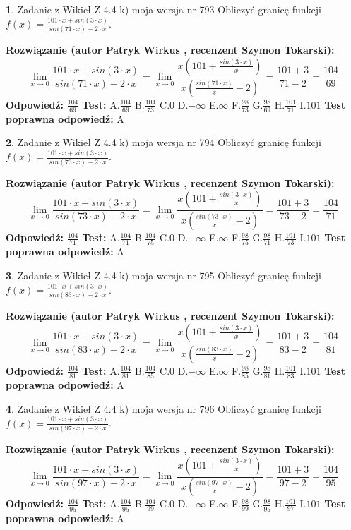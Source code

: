 \documentclass[12pt, a4paper]{article}
\theoremstyle{definition} %
\newtheorem{zad}{}
\newcommand{\zadStart}[1]{\begin{zad}#1\newline}
\newcommand{\zadStop}{\end{zad}}
\newcommand{\rozwStart}[2]{\noindent \textbf{Rozwiązanie (autor #1 , recenzent #2): }\newline}
\newcommand{\rozwStop}{\newline}
\newcommand{\odpStart}{\noindent \textbf{Odpowiedź:}\newline}
\newcommand{\odpStop}{\newline}
\newcommand{\testStart}{\noindent \textbf{Test:}\newline}
\newcommand{\testStop}{\newline}
\newcommand{\kluczStart}{\noindent \textbf{Test poprawna odpowiedź:}\newline}
\newcommand{\kluczStop}{\newline}
\begin{document}
\zadStart{Zadanie z Wikieł Z 4.4 k) moja wersja nr 793}
Obliczyć granicę funkcji $f(x)=\frac{101\cdot x +sin(3\cdot x)}{sin(71\cdot x) -2\cdot x}$.
\zadStop
\rozwStart{Patryk Wirkus}{Szymon Tokarski}
$$\lim\limits_{x\to 0}\frac{101\cdot x +sin(3\cdot x)}{sin(71\cdot x) -2\cdot x}
=\lim\limits_{x\to 0}\frac{x(101+\frac{sin(3\cdot x)}{x})}{x(\frac{sin(71\cdot x)}{x}-2)}
=\frac{101+3}{71-2} = \frac{104}{69}$$
\rozwStop
\odpStart
$\frac{104}{69}$
\odpStop
\testStart
A.$\frac{104}{69}$
B.$\frac{104}{73}$
C.$0$
D.$-\infty$
E.$\infty$
F.$\frac{98}{73}$
G.$\frac{98}{69}$
H.$\frac{101}{71}$
I.$101$
\testStop
\kluczStart
A
\kluczStop



\zadStart{Zadanie z Wikieł Z 4.4 k) moja wersja nr 794}
Obliczyć granicę funkcji $f(x)=\frac{101\cdot x +sin(3\cdot x)}{sin(73\cdot x) -2\cdot x}$.
\zadStop
\rozwStart{Patryk Wirkus}{Szymon Tokarski}
$$\lim\limits_{x\to 0}\frac{101\cdot x +sin(3\cdot x)}{sin(73\cdot x) -2\cdot x}
=\lim\limits_{x\to 0}\frac{x(101+\frac{sin(3\cdot x)}{x})}{x(\frac{sin(73\cdot x)}{x}-2)}
=\frac{101+3}{73-2} = \frac{104}{71}$$
\rozwStop
\odpStart
$\frac{104}{71}$
\odpStop
\testStart
A.$\frac{104}{71}$
B.$\frac{104}{75}$
C.$0$
D.$-\infty$
E.$\infty$
F.$\frac{98}{75}$
G.$\frac{98}{71}$
H.$\frac{101}{73}$
I.$101$
\testStop
\kluczStart
A
\kluczStop



\zadStart{Zadanie z Wikieł Z 4.4 k) moja wersja nr 795}
Obliczyć granicę funkcji $f(x)=\frac{101\cdot x +sin(3\cdot x)}{sin(83\cdot x) -2\cdot x}$.
\zadStop
\rozwStart{Patryk Wirkus}{Szymon Tokarski}
$$\lim\limits_{x\to 0}\frac{101\cdot x +sin(3\cdot x)}{sin(83\cdot x) -2\cdot x}
=\lim\limits_{x\to 0}\frac{x(101+\frac{sin(3\cdot x)}{x})}{x(\frac{sin(83\cdot x)}{x}-2)}
=\frac{101+3}{83-2} = \frac{104}{81}$$
\rozwStop
\odpStart
$\frac{104}{81}$
\odpStop
\testStart
A.$\frac{104}{81}$
B.$\frac{104}{85}$
C.$0$
D.$-\infty$
E.$\infty$
F.$\frac{98}{85}$
G.$\frac{98}{81}$
H.$\frac{101}{83}$
I.$101$
\testStop
\kluczStart
A
\kluczStop



\zadStart{Zadanie z Wikieł Z 4.4 k) moja wersja nr 796}
Obliczyć granicę funkcji $f(x)=\frac{101\cdot x +sin(3\cdot x)}{sin(97\cdot x) -2\cdot x}$.
\zadStop
\rozwStart{Patryk Wirkus}{Szymon Tokarski}
$$\lim\limits_{x\to 0}\frac{101\cdot x +sin(3\cdot x)}{sin(97\cdot x) -2\cdot x}
=\lim\limits_{x\to 0}\frac{x(101+\frac{sin(3\cdot x)}{x})}{x(\frac{sin(97\cdot x)}{x}-2)}
=\frac{101+3}{97-2} = \frac{104}{95}$$
\rozwStop
\odpStart
$\frac{104}{95}$
\odpStop
\testStart
A.$\frac{104}{95}$
B.$\frac{104}{99}$
C.$0$
D.$-\infty$
E.$\infty$
F.$\frac{98}{99}$
G.$\frac{98}{95}$
H.$\frac{101}{97}$
I.$101$
\testStop
\kluczStart
A
\kluczStop
\end{document}
